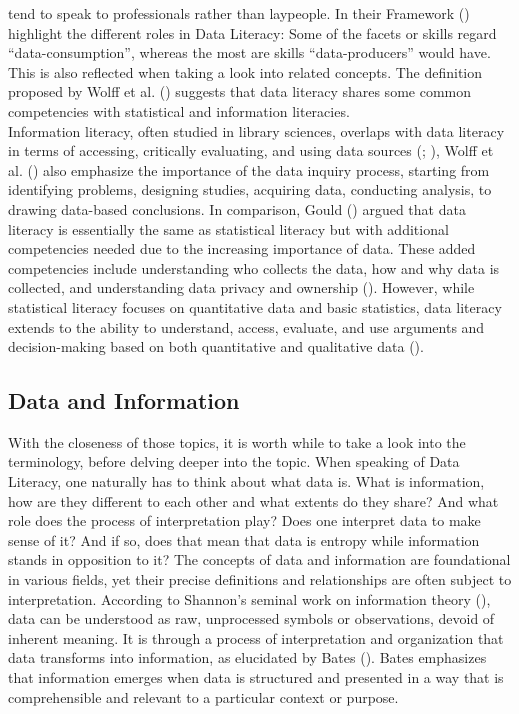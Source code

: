 \documentclass[
  12pt,
  a4paper,
  twoside]{article}
\begin{document}
tend to speak to professionals rather than laypeople. In their Framework
() highlight the different
roles in Data Literacy: Some of the facets or skills regard
``data-consumption'', whereas the most are skills ``data-producers''
would have. This is also reflected when taking a look into related
concepts. The definition proposed by Wolff et al.
() suggests that data literacy shares some
common competencies with statistical and information literacies.\\
Information literacy, often studied in library sciences, overlaps with
data literacy in terms of accessing, critically evaluating, and using
data sources (;
), Wolff et al.
() also emphasize the importance of the
data inquiry process, starting from identifying problems, designing
studies, acquiring data, conducting analysis, to drawing data-based
conclusions. In comparison, Gould ()
argued that data literacy is essentially the same as statistical
literacy but with additional competencies needed due to the increasing
importance of data. These added competencies include understanding who
collects the data, how and why data is collected, and understanding data
privacy and ownership (). However,
while statistical literacy focuses on quantitative data and basic
statistics, data literacy extends to the ability to understand, access,
evaluate, and use arguments and decision-making based on both
quantitative and qualitative data ().

\subsection{Data and Information}\label{data-and-information}

With the closeness of those topics, it is worth while to take a look
into the terminology, before delving deeper into the topic. When
speaking of Data Literacy, one naturally has to think about what data
is. What is information, how are they different to each other and what
extents do they share? And what role does the process of interpretation
play? Does one interpret data to make sense of it? And if so, does that
mean that data is entropy while information stands in opposition to it?
The concepts of data and information are foundational in various fields,
yet their precise definitions and relationships are often subject to
interpretation. According to Shannon's seminal work on information
theory (), data can be
understood as raw, unprocessed symbols or observations, devoid of
inherent meaning. It is through a process of interpretation and
organization that data transforms into information, as elucidated by
Bates (). Bates emphasizes that
information emerges when data is structured and presented in a way that
is comprehensible and relevant to a particular context or purpose.
\end{document}
